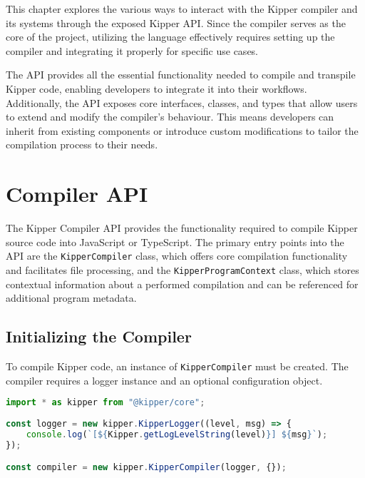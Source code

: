 
This chapter explores the various ways to interact with the Kipper compiler and its systems through the exposed Kipper API. Since the compiler serves as the core of the project, utilizing the language effectively requires setting up the compiler and integrating it properly for specific use cases.

The API provides all the essential functionality needed to compile and \gls{transpile} Kipper code, enabling developers to integrate it into their workflows. Additionally, the API exposes core interfaces, classes, and types that allow users to extend and modify the compiler’s behaviour. This means developers can inherit from existing components or introduce custom modifications to tailor the compilation process to their needs.

\section{Compiler API}
\label{sec:compiler_api}

The Kipper Compiler API provides the functionality required to compile Kipper source code into JavaScript or TypeScript. The primary entry points into the API are the \lstinline|KipperCompiler| class, which offers core compilation functionality and facilitates file processing, and the \lstinline|KipperProgramContext| class, which stores contextual information about a performed compilation and can be referenced for additional program metadata.

\subsection{Initializing the Compiler}
\label{subsec:compiler_init}

To compile Kipper code, an instance of \lstinline|KipperCompiler| must be created. The compiler requires a logger instance and an optional configuration object.

\begin{lstlisting}[language=Typescript, caption=Initializing the Kipper Compiler, label=lst:compiler_initialization]
import * as kipper from "@kipper/core";
	
const logger = new kipper.KipperLogger((level, msg) => {
	console.log(`[${Kipper.getLogLevelString(level)}] ${msg}`);
});

const compiler = new kipper.KipperCompiler(logger, {});
\end{lstlisting}

